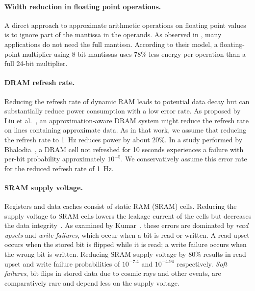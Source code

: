 \paragraph{Width reduction in floating point operations.}
A direct approach to approximate arithmetic operations on floating point values
is to ignore part of the mantissa in the operands. As observed in
\cite{bitwidthred}, many applications do not need the full mantissa.
According to their model,
a floating-point multiplier using 8-bit mantissas uses 78\% less
energy per operation than a full 24-bit multiplier.




\paragraph{DRAM refresh rate.}
Reducing the refresh rate of dynamic RAM leads to potential data decay
but can substantially reduce power consumption with a low error rate.
As proposed by Liu et al.~\cite{flikker}, an approximation-aware DRAM system
might reduce the refresh rate on lines containing approximate data. As in
that work, we assume that reducing the refresh rate to 1~Hz
reduces power by about 20\%.
In a study performed by Bhalodia~\cite{dramthesis}, a DRAM cell not
refreshed for 10 seconds experiences a failure with per-bit
probability approximately $10^{-5}$. We conservatively assume this error
rate for the reduced refresh rate of 1~Hz.

\paragraph{SRAM supply voltage.}
Registers and data caches consist of static RAM (SRAM)
cells. Reducing the supply voltage to SRAM cells lowers the leakage
current of the cells but decreases the data integrity~\cite{drowsycaches}. As
examined by Kumar~\cite{sramthesis}, these
errors are dominated by \emph{read upsets} and \emph{write failures},
which occur when a bit is read or written. A read upset occurs when
the stored bit is flipped while it is read; a write failure occurs when the
wrong bit is written.
Reducing SRAM supply voltage by 80\% results in
read upset and write failure probabilities of $10^{-7.4}$ and
$10^{-4.94}$ respectively.
\emph{Soft failures}, bit flips in
stored data due to cosmic rays and other events, are comparatively
rare and depend less on the supply voltage.

